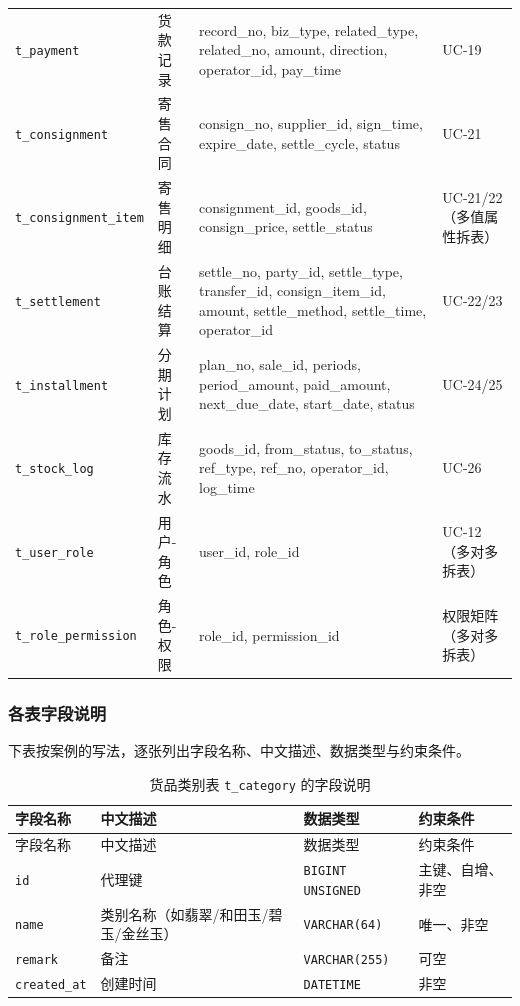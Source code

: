 \documentclass[12pt, a4paper]{ctexart}
\newcommand{\code}[1]{\texttt{\small #1}}
\begin{document}
\begin{longtable}{@{}p{3.3cm} p{1.9cm} p{5.7cm} p{2.3cm}@{}}
\code{t\_payment} & 货款记录 & record\_no, biz\_type, related\_type, related\_no, amount, direction, operator\_id, pay\_time & UC-19 \\
\code{t\_consignment} & 寄售合同 & consign\_no, supplier\_id, sign\_time, expire\_date, settle\_cycle, status & UC-21 \\
\code{t\_consignment\_item} & 寄售明细 & consignment\_id, goods\_id, consign\_price, settle\_status & UC-21/22（多值属性拆表）\\
\code{t\_settlement} & 台账结算 & settle\_no, party\_id, settle\_type, transfer\_id, consign\_item\_id, amount, settle\_method, settle\_time, operator\_id & UC-22/23 \\
\code{t\_installment} & 分期计划 & plan\_no, sale\_id, periods, period\_amount, paid\_amount, next\_due\_date, start\_date, status & UC-24/25 \\
\code{t\_stock\_log} & 库存流水 & goods\_id, from\_status, to\_status, ref\_type, ref\_no, operator\_id, log\_time & UC-26 \\
\code{t\_user\_role} & 用户-角色 & user\_id, role\_id & UC-12（多对多拆表）\\
\code{t\_role\_permission} & 角色-权限 & role\_id, permission\_id & 权限矩阵（多对多拆表）\\
\end{longtable}

\subsubsection{各表字段说明}

下表按案例的写法，逐张列出字段名称、中文描述、数据类型与约束条件。

\begin{longtable}{@{}p{3.1cm} p{4.5cm} p{2.4cm} p{4.5cm}@{}}
\caption{货品类别表 \code{t\_category} 的字段说明}\label{tab:f-t-category}\\
\toprule
字段名称 & 中文描述 & 数据类型 & 约束条件 \\
\midrule
\endfirsthead
\toprule
字段名称 & 中文描述 & 数据类型 & 约束条件 \\
\midrule
\endhead
\bottomrule
\endlastfoot
\code{id} & 代理键 & \code{BIGINT UNSIGNED} & 主键、自增、非空 \\
\code{name} & 类别名称（如翡翠/和田玉/碧玉/金丝玉） & \code{VARCHAR(64)} & 唯一、非空 \\
\code{remark} & 备注 & \code{VARCHAR(255)} & 可空 \\
\code{created\_at} & 创建时间 & \code{DATETIME} & 非空 \\
\end{longtable}
\end{document}
